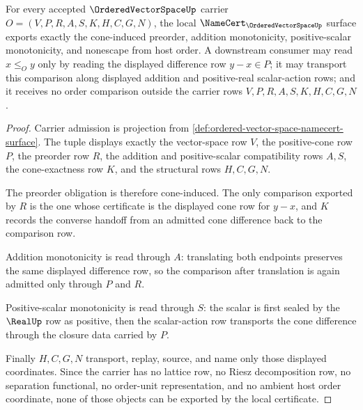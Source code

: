 \begin{theorem}
\label{thm:ordered-vector-space-positive-cone-obligations}
For every accepted $\OrderedVectorSpaceUp$ carrier $O=(V,P,R,A,S,K,H,C,G,N)$, the local $\NameCert_{\OrderedVectorSpaceUp}$ surface exports exactly the cone-induced preorder, addition monotonicity, positive-scalar monotonicity, and nonescape from host order. A downstream consumer may read $x\leq_O y$ only by reading the displayed difference row $y-x\in P$; it may transport this comparison along displayed addition and positive-real scalar-action rows; and it receives no order comparison outside the carrier rows $V,P,R,A,S,K,H,C,G,N$.
\end{theorem}
\begin{proof}
Carrier admission is projection from \autoref{def:ordered-vector-space-namecert-surface}. The tuple displays exactly the vector-space row $V$, the positive-cone row $P$, the preorder row $R$, the addition and positive-scalar compatibility rows $A,S$, the cone-exactness row $K$, and the structural rows $H,C,G,N$.

The preorder obligation is therefore cone-induced. The only comparison exported by $R$ is the one whose certificate is the displayed cone row for $y-x$, and $K$ records the converse handoff from an admitted cone difference back to the comparison row.

Addition monotonicity is read through $A$: translating both endpoints preserves the same displayed difference row, so the comparison after translation is again admitted only through $P$ and $R$.

Positive-scalar monotonicity is read through $S$: the scalar is first sealed by the $\RealUp$ row as positive, then the scalar-action row transports the cone difference through the closure data carried by $P$.

Finally $H,C,G,N$ transport, replay, source, and name only those displayed coordinates. Since the carrier has no lattice row, no Riesz decomposition row, no separation functional, no order-unit representation, and no ambient host order coordinate, none of those objects can be exported by the local certificate.
\end{proof}


